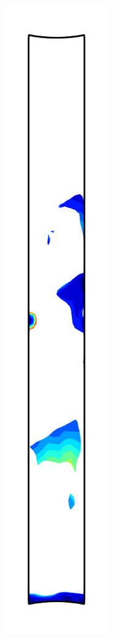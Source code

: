 \begin{figure}[!htb]
\begin{subfigure}{0.08\textwidth}
  \end{subfigure}
  \begin{subfigure}{0.08\textwidth}
    \centering
    \includegraphics[width=\textwidth]{Chapter5/figures/spallation/psii_9}

\end{subfigure}
\end{figure}
